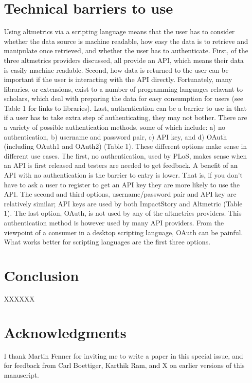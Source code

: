 \documentclass[letterpaper,superscriptaddress,showkeys,longbibliography]{revtex4-1}\usepackage{graphicx, color}
\begin{document}
\section*{Technical barriers to use}

Using altmetrics via a scripting language means that the user has to consider whether the data source is machine readable, how easy the data is to retrieve and manipulate once retrieved, and whether the user has to authenticate. First, of the three altmetrics providers discussed, all provide an API, which means their data is easily machine readable. Second, how data is returned to the user can be important if the user is interacting with the API directly. Fortunately, many libraries, or extensions, exist to a number of programming languages relavant to scholars, which deal with preparing the data for easy consumption for users (see Table 1 for links to libraries). Last, authentication can be a barrier to use in that if a user has to take extra step of authenticating, they may not bother. There are a variety of possible authentication methods, some of which include: a) no authentication, b) username and password pair, c) API key, and d) OAuth (including OAuth1 and OAuth2) (Table 1). These different options make sense in different use cases. The first, no authentication, used by PLoS, makes sense when an API is first released and testers are needed to get feedback. A benefit of an API with no authentication is the barrier to entry is lower. That is, if you don't have to ask a user to register to get an API key they are more likely to use the API. The second and third options, username/password pair and API key are relatively similar; API keys are used by both ImpactStory and Altmetric (Table 1). The last option, OAuth, is not used by any of the altmetrics providers. This authentication method is however used by many API providers. From the viewpoint of a consumer in a desktop scripting language, OAuth can be painful. What works better for scripting languages are the first three options.  

\section*{Conclusion}

XXXXXX

\section*{Acknowledgments}

I thank Martin Fenner for inviting me to write a paper in this special issue, and for feedback from Carl Boettiger, Karthik Ram, and X on earlier versions of this manuscript.
  
\end{document}
